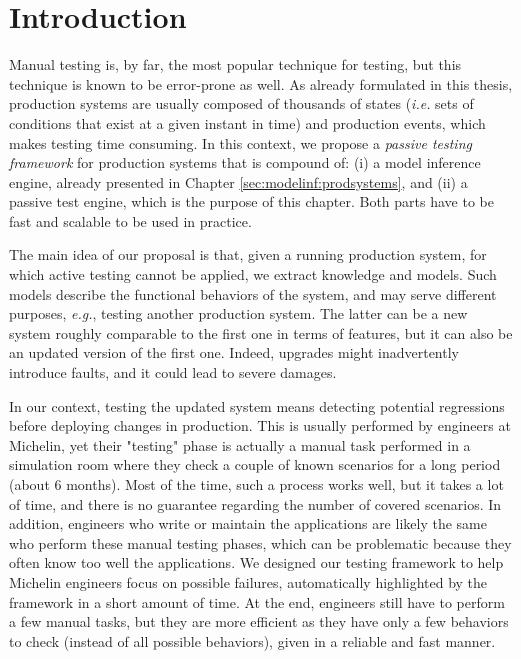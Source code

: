 \section{Introduction}
\label{sec:testing:intro}

Manual testing is, by far, the most popular technique for
testing, but this technique is known to be error-prone as well.
As already formulated in this thesis, production systems are
usually composed of thousands of states (\emph{i.e.} sets of
conditions that exist at a given instant in time) and production
events, which makes testing time consuming.  In this context, we
propose a \emph{passive testing framework} for production systems
that is compound of: (i) a model inference engine, already
presented in Chapter \ref{sec:modelinf:prodsystems}, and (ii) a
passive test engine, which is the purpose of this chapter. Both
parts have to be fast and scalable to be used in practice.

The main idea of our proposal is that, given a running production
system, for which active testing cannot be applied, we extract
knowledge and models. Such models describe the functional
behaviors of the system, and may serve different purposes,
\emph{e.g.}, testing another production system. The latter can be
a new system roughly comparable to the first one in terms of
features, but it can also be an updated version of the first one.
Indeed, upgrades might inadvertently introduce faults, and it
could lead to severe damages.

In our context, testing the updated system means detecting potential
regressions before deploying changes in production. This is
usually performed by engineers at Michelin, yet their "testing"
phase is actually a manual task performed in a simulation room
where they check a couple of known scenarios for a long period
(about 6 months). Most of the time, such a process works well,
but it takes a lot of time, and there is no guarantee regarding
the number of covered scenarios. In addition, engineers who write
or maintain the applications are likely the same who perform
these manual testing phases, which can be problematic because
they often know too well the applications. We designed our
testing framework to help Michelin engineers focus on possible
failures, automatically highlighted by the framework in a short
amount of time. At the end, engineers still have to perform a few
manual tasks, but they are more efficient as they have only a few
behaviors to check (instead of all possible behaviors), given in
a reliable and fast manner.

